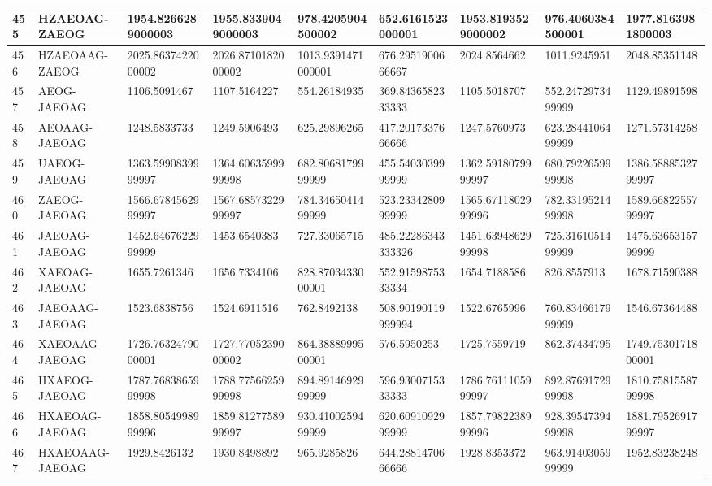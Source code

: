 {\begin{longtable}{|l|l|l|l|l|l|l|l|l|}
        455 & HZAEOAG-ZAEOG & 1954.8266289000003 & 1955.8339049000003 & 978.4205904500002 & 652.6161523000001 & 1953.8193529000002 & 976.4060384500001 & 1977.8163981800003 \\ \hline
        456 & HZAEOAAG-ZAEOG & 2025.8637422000002 & 2026.8710182000002 & 1013.9391471000001 & 676.2951900666667 & 2024.8564662 & 1011.9245951 & 2048.85351148 \\ \hline
        457 & AEOG-JAEOAG & 1106.5091467 & 1107.5164227 & 554.26184935 & 369.8436582333333 & 1105.5018707 & 552.2472973499999 & 1129.49891598 \\ \hline
        458 & AEOAAG-JAEOAG & 1248.5833733 & 1249.5906493 & 625.29896265 & 417.2017337666666 & 1247.5760973 & 623.2844106499999 & 1271.57314258 \\ \hline
        459 & UAEOG-JAEOAG & 1363.5990839999997 & 1364.6063599999998 & 682.8068179999999 & 455.5403039999999 & 1362.5918079999997 & 680.7922659999998 & 1386.5888532799997 \\ \hline
        460 & ZAEOG-JAEOAG & 1566.6784562999997 & 1567.6857322999997 & 784.3465041499999 & 523.2334280999999 & 1565.6711802999996 & 782.3319521499998 & 1589.6682255799997 \\ \hline
        461 & JAEOAG-JAEOAG & 1452.6467622999999 & 1453.6540383 & 727.33065715 & 485.22286343333326 & 1451.6394862999998 & 725.3161051499999 & 1475.6365315799999 \\ \hline
        462 & XAEOAG-JAEOAG & 1655.7261346 & 1656.7334106 & 828.8703433000001 & 552.9159875333334 & 1654.7188586 & 826.8557913 & 1678.71590388 \\ \hline
        463 & JAEOAAG-JAEOAG & 1523.6838756 & 1524.6911516 & 762.8492138 & 508.90190119999994 & 1522.6765996 & 760.8346617999999 & 1546.67364488 \\ \hline
        464 & XAEOAAG-JAEOAG & 1726.7632479000001 & 1727.7705239000002 & 864.3888999500001 & 576.5950253 & 1725.7559719 & 862.37434795 & 1749.7530171800001 \\ \hline
        465 & HXAEOG-JAEOAG & 1787.7683865999998 & 1788.7756625999998 & 894.8914692999999 & 596.9300715333333 & 1786.7611105999997 & 892.8769172999998 & 1810.7581558799998 \\ \hline
        466 & HXAEOAG-JAEOAG & 1858.8054998999996 & 1859.8127758999997 & 930.4100259499999 & 620.6091092999999 & 1857.7982238999996 & 928.3954739499998 & 1881.7952691799997 \\ \hline
        467 & HXAEOAAG-JAEOAG & 1929.8426132 & 1930.8498892 & 965.9285826 & 644.2881470666666 & 1928.8353372 & 963.9140305999999 & 1952.83238248 \\ \hline

\end{longtable}}
